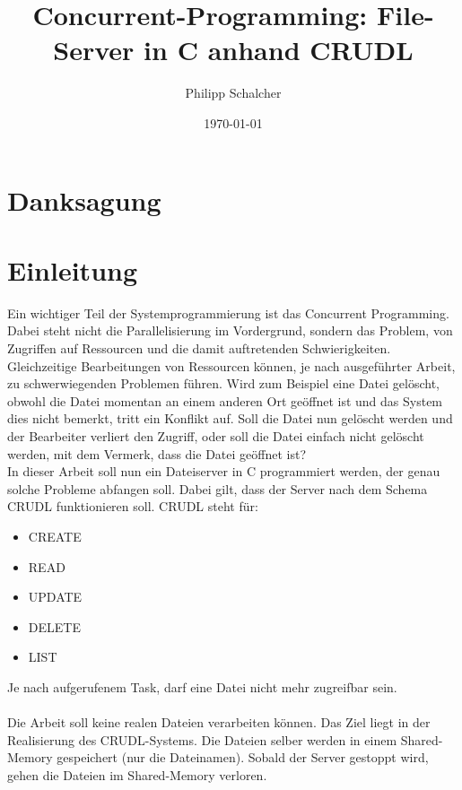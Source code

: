 \documentclass[12pt,a4paper,ngerman]{report}
\author{Philipp Schalcher}
\title{Concurrent-Programming: File-Server in C anhand CRUDL}
\date{\today}
\begin{document}

\chapter*{Danksagung}
\tableofcontents
\begin{abstract}

\end{abstract}
\chapter*{Einleitung}
Ein wichtiger Teil der Systemprogrammierung ist das Concurrent Programming. Dabei steht nicht die Parallelisierung im Vordergrund, sondern das Problem, von Zugriffen auf Ressourcen und die damit auftretenden Schwierigkeiten. Gleichzeitige Bearbeitungen von Ressourcen können, je nach ausgeführter Arbeit, zu schwerwiegenden Problemen führen. Wird zum Beispiel eine Datei gelöscht, obwohl die Datei momentan an einem anderen Ort geöffnet ist und das System dies nicht bemerkt, tritt ein Konflikt auf. Soll die Datei nun gelöscht werden und der Bearbeiter verliert den Zugriff, oder soll die Datei einfach nicht gelöscht werden, mit dem Vermerk, dass die Datei geöffnet ist?
\\
In dieser Arbeit soll nun ein Dateiserver in C programmiert werden, der genau solche Probleme abfangen soll. Dabei gilt, dass der Server nach dem Schema CRUDL funktionieren soll. CRUDL steht für:
\begin{itemize}
	\item CREATE
	\item READ
	\item UPDATE
	\item DELETE
	\item LIST
\end{itemize}
Je nach aufgerufenem Task, darf eine Datei nicht mehr zugreifbar sein.
\\
\\
Die Arbeit soll keine realen Dateien verarbeiten können. Das Ziel liegt in der Realisierung des CRUDL-Systems. Die Dateien selber werden in einem Shared-Memory gespeichert (nur die Dateinamen). Sobald der Server gestoppt wird, gehen die Dateien im Shared-Memory verloren.
\end{document}
